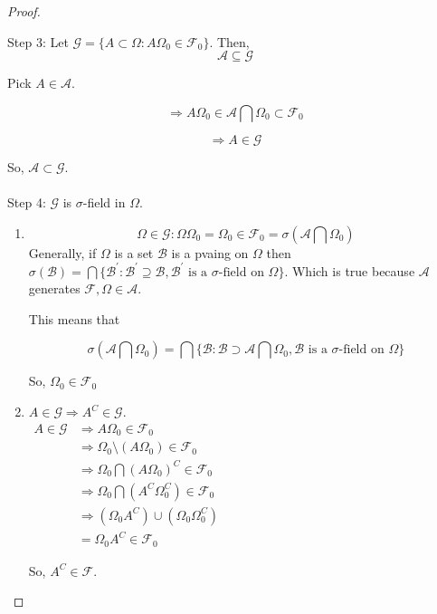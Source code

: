 \documentclass[11pt,fleqn]{book} %
\begin{document}
\begin{proof}
\begin{enumerate}[label = (\roman*)]
			Step 3: Let $\mathcal{G} = \{A \subset \Omega: A \Omega_0 \in \mathcal{F}_0 \}$. 
			Then, 
			$$\mathcal{A} \subseteq \mathcal{G} $$

				Pick $A \in \mathcal{A}$.

			
					$$\Rightarrow A\Omega_0 \in \mathcal{A} \bigcap \Omega_0 \subset \mathcal{F}_0$$
			

					$$\Rightarrow A \in \mathcal{G} $$

				So, $\mathcal{A} \subset \mathcal{G}$.\\
				\\

			Step 4: $\mathcal{G}$ is $\sigma$-field in $\Omega$.

				\begin{enumerate}
					\item $$\Omega \in \mathcal{G}: \Omega\Omega_0 = \Omega_0 \in \mathcal{F}_0 = \sigma(\mathcal{A} \bigcap \Omega_0)$$ 
					Generally, if $\Omega$ is a set $\mathcal{B}$ is a pvaing on $\Omega$ then $\sigma(\mathcal{B}) = \bigcap \{\mathcal{B}^\prime : \mathcal{B}^\prime \supseteq \mathcal{B}, \mathcal{B}^\prime \text{ is a }\sigma\text{-field on }\Omega \}.$ Which is true because $\mathcal{A}$ generates $\mathcal{F}, \Omega \in \mathcal{A}$.

					This means that 

							$$\sigma(\mathcal{A} \bigcap \Omega_0) = \bigcap \{\mathcal{B}: \mathcal{B} \supset \mathcal{A} \bigcap \Omega_0, \mathcal{B}  \text{ is a }\sigma\text{-field on }\Omega \} $$

					So, $\Omega_0 \in \mathcal{F}_0$
					\item $A \in \mathcal{G} \Rightarrow A^C \in \mathcal{G}$.\\

					$\begin{aligned}
						A \in \mathcal{G} &\Rightarrow A \Omega_0 \in \mathcal{F}_0\\
							&\Rightarrow \Omega_0 \setminus (A \Omega_0) \in \mathcal{F}_0\\
							&\Rightarrow \Omega_0 \bigcap (A \Omega_0)^C \in \mathcal{F}_0\\
							&\Rightarrow \Omega_0 \bigcap (A^C \Omega_0^C) \in \mathcal{F}_0\\
							&\Rightarrow (\Omega_0 A^C) \cup (\Omega_0 \Omega_0^C)\\
							&= \Omega_0 A^C \in \mathcal{F}_0
					\end{aligned}$

					So, $A^C \in \mathcal{F}$.


\end{enumerate}
\end{enumerate}
\end{proof}
\end{document}
